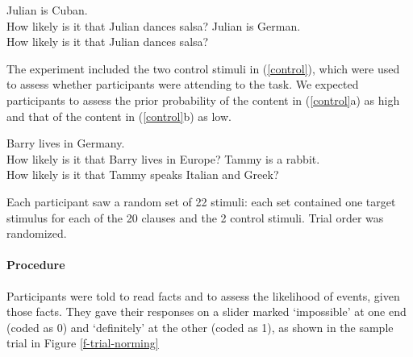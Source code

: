 \documentclass[11pt,fleqn]{article}
\newcommand{\6}{\mbox{$[\hspace*{-.6mm}[$}}
\newcommand{\9}{\mbox{$]\hspace*{-.6mm}]$}}
\begin{document}
\begin{exe}
\ex\label{target} 
\begin{xlist}
 Julian is Cuban. \\ How likely is it that Julian dances salsa?
 Julian is German. \\ How likely is it that Julian dances salsa?
\end{xlist}
\end{exe}

The experiment included the two control stimuli in (\ref{control}), which were used to assess whether participants were attending to the task. We expected participants to assess the prior probability of the content in (\ref{control}a) as high and that of the content in (\ref{control}b) as low.

\begin{exe}
\ex\label{control}
\begin{xlist}
 Barry lives in Germany. \\ How likely is it that Barry lives in Europe?
 Tammy is a rabbit. \\ How likely is it that Tammy speaks Italian and Greek?
\end{xlist}
\end{exe}

Each participant saw a random set of 22 stimuli: each set contained one target stimulus for each of the 20 clauses and the 2 control stimuli. Trial order was randomized.

\paragraph{Procedure} Participants were told to read facts and to assess the likelihood of events, given those facts. They gave their responses on a slider marked `impossible' at one end (coded as 0) and `definitely' at the other (coded as 1), as shown in the sample trial in Figure \ref{f-trial-norming}
\end{document}
